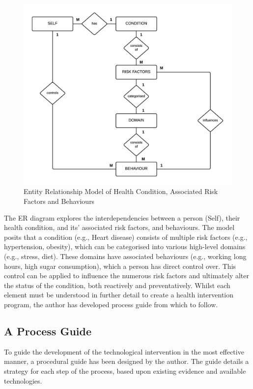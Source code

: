 \begin{figure}[h]
    \centering
    \includegraphics[scale=0.9, angle=0]{Files/prevention-study-1/figures/erd-riskfactors}
    \caption{Entity Relationship Model of Health Condition, Associated Risk Factors and Behaviours}
    \label{fig: erd-model}
\end{figure}

The ER diagram explores the interdependencies between a person (Self), their health condition, and its' associated risk factors, and behaviours. The model posits that a condition (e.g., Heart disease) consists of multiple risk factors (e.g., hypertension, obesity), which can be categorised into various high-level domains (e.g., stress, diet). These domains have associated behaviours (e.g., working long hours, high sugar consumption), which a person has direct control over. This control can be applied to influence the numerous risk factors and ultimately alter the status of the condition, both reactively and preventatively.
Whilst each element must be understood in further detail to create a health intervention program, the author has developed process guide from which to follow.

\subsection{A Process Guide} \label{subsection: framework-process}
To guide the development of the technological intervention in the most effective manner, a procedural guide has been designed by the author. The guide details a strategy for each step of the process, based upon existing evidence and available technologies.

